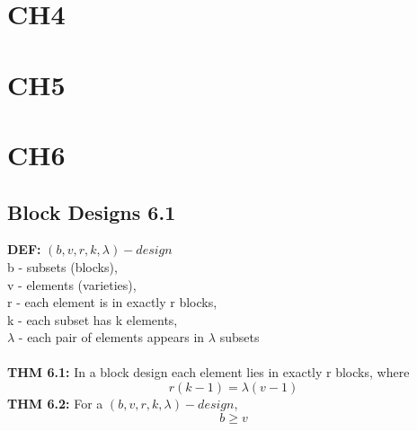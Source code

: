 \documentclass[12pt]{article}
\begin{document}
	
	\section{CH4}
	\section{CH5}
	\section{CH6}
	\subsection{Block Designs 6.1}
	\textbf{DEF:} $ (b,v,r,k,\lambda)-design $ \\
	b - subsets (blocks),\\
	v - elements (varieties),\\
	r - each element is in exactly r blocks, \\
	k - each subset has k elements, \\
	$ \lambda $ - each pair of elements appears in $ \lambda $ subsets\\\\
	\textbf{THM 6.1:} In a block design each element lies in exactly r blocks, where
	\[ 	r(k-1) = \lambda(v-1) \]
	\textbf{THM 6.2:}  For a  $ (b,v,r,k,\lambda)-design $, 
	\[ b \geq v \]
	
\end{document}
